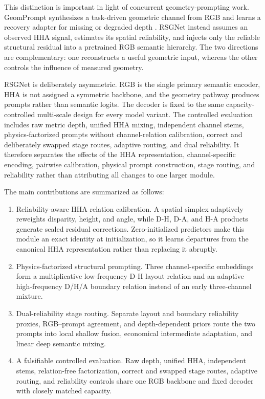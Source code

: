\documentclass[a4paper,fleqn]{cas-dc}
\begin{document}
This distinction is important in light of concurrent geometry-prompting work. GeomPrompt synthesizes a task-driven geometric channel from RGB and learns a recovery adapter for missing or degraded depth \citep{jaganathan2026geomprompt}. RSGNet instead assumes an observed HHA signal, estimates its spatial reliability, and injects only the reliable structural residual into a pretrained RGB semantic hierarchy. The two directions are complementary: one reconstructs a useful geometric input, whereas the other controls the influence of measured geometry.

RSGNet is deliberately asymmetric. RGB is the single primary semantic encoder, HHA is not assigned a symmetric backbone, and the geometry pathway produces prompts rather than semantic logits. The decoder is fixed to the same capacity-controlled multi-scale design for every model variant. The controlled evaluation includes raw metric depth, unified HHA mixing, independent channel stems, physics-factorized prompts without channel-relation calibration, correct and deliberately swapped stage routes, adaptive routing, and dual reliability. It therefore separates the effects of the HHA representation, channel-specific encoding, pairwise calibration, physical prompt construction, stage routing, and reliability rather than attributing all changes to one larger module.

The main contributions are summarized as follows:
\begin{enumerate}
\item Reliability-aware HHA relation calibration. A spatial simplex adaptively reweights disparity, height, and angle, while D-H, D-A, and H-A products generate scaled residual corrections. Zero-initialized predictors make this module an exact identity at initialization, so it learns departures from the canonical HHA representation rather than replacing it abruptly.
\item Physics-factorized structural prompting. Three channel-specific embeddings form a multiplicative low-frequency D-H layout relation and an adaptive high-frequency D/H/A boundary relation instead of an early three-channel mixture.
\item Dual-reliability stage routing. Separate layout and boundary reliability proxies, RGB--prompt agreement, and depth-dependent priors route the two prompts into local shallow fusion, economical intermediate adaptation, and linear deep semantic mixing.
\item A falsifiable controlled evaluation. Raw depth, unified HHA, independent stems, relation-free factorization, correct and swapped stage routes, adaptive routing, and reliability controls share one RGB backbone and fixed decoder with closely matched capacity.
\end{enumerate}
\end{document}
